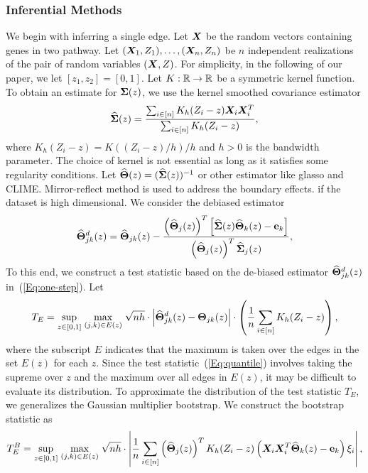 \documentclass[11pt]{article}
\begin{document}
\subsubsection{Inferential Methods}

We begin with inferring a single edge. Let $\bm{X}$ be the random vectors containing genes in two pathway.  
Let $(\bm{X}_1,Z_1),\ldots,(\bm{X}_n,Z_n)$ be $n$ independent realizations of the pair of random variables $(\bm{X},Z)$. For simplicity, in the following of our paper, we let $[z_1, z_2] = [0,1]$.
Let $K : \mathbb{R} \rightarrow \mathbb{R}$ be a symmetric kernel function.
To obtain an estimate for $\bm{\Sigma}(z)$, we use the kernel smoothed covariance  estimator 
\begin{equation}
\label{Eq:estimator}
\widehat{\bm{\Sigma}} (z) = \frac{\sum_{i\in [n]}  K_h (Z_i-z) \bm{X}_i \bm{X}_i^T}{\sum_{i\in [n]} K_h (Z_i-z)},
\end{equation}
where $K_h (Z_i -z ) =  K\left((Z_i -z )/h\right)/h$ and $h>0$ is the bandwidth parameter.
The choice of kernel is not essential as long as it satisfies some regularity conditions. Let $\widehat {\bm{\Theta}}(z) = (\widehat {\bm{\Sigma}}(z))^{-1}$ or other estimator like glasso and CLIME. Mirror-reflect method is used to address the boundary effects. if the dataset is high dimensional. We consider  the debiased estimator 
\begin{equation}
\label{Eq:one-step}
\widehat{\bm{\Theta}}_{jk}^d (z) = \widehat{\bm{\Theta}}_{jk} (z)
  - \frac{\left(\widehat{\bm{\Theta}}_j (z)\right)^T \left[ \widehat{\bm{\Sigma}}(z) \widehat{\bm{\Theta}}_k (z)- \mathbf{e}_k \right]     }{ \left( \widehat{\bm{\Theta}}_j(z)\right)^T \widehat{\bm{\Sigma}}_j(z)},
\end{equation}
To this end, we construct a test statistic based on the de-biased estimator  $\widehat{\bm{\Theta}}^d_{jk}(z)$ in~(\ref{Eq:one-step}). 
Let
\begin{equation}
\label{Eq:quantile}
T_E =  \underset{z\in [0,1]}{\sup} \;\underset{(j,k)\in E(z)}{\max} \; 
\sqrt{nh}\cdot  \left|\widehat{\bm{\Theta}}_{jk}^d (z) - \bm{\Theta}_{jk} (z)\right| \cdot \left(\frac{1}{n}\sum_{i \in [n]} K_h(Z_i-z) \right),
\end{equation}
where the subscript $E$ indicates that the maximum is taken over the edges in the set $E(z)$ for each $z$. 
Since the test statistic~(\ref{Eq:quantile}) involves taking the supreme over $z$ and the maximum over all edges in $E(z)$, it may be difficult to evaluate its distribution.
To approximate the distribution of the test statistic $T_E$, we generalizes the  Gaussian multiplier bootstrap. We construct the bootstrap statistic as
\begin{equation}
\label{Eq:approx test}
T^B_E = \underset{z\in [0,1]}{\sup} \; \underset{(j,k) \in E(z) }{\max} \;\sqrt{nh}\cdot \left| \frac{1}{n}  \sum_{i\in [n]} \left(\widehat{\bm{\Theta}}_j (z)\right)^T K_h (Z_i-z) \left( \bm{X}_i \bm{X}_i^T\widehat{\bm{\Theta}}_k (z)  - \mathbf{e}_k\right) \xi_i\right|,
\end{equation}
\end{document}
